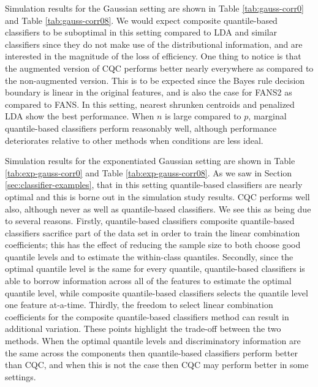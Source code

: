 Simulation results for the Gaussian setting are shown in Table
\ref{tab:gauss-corr0} and Table \ref{tab:gauss-corr08}.  We would expect
composite quantile-based classifiers to be suboptimal in this setting compared
to LDA and similar classifiers since they do not make use of the distributional
information, and are interested in the magnitude of the loss of efficiency.  One
thing to notice is that the augmented version of CQC performs better nearly
everywhere as compared to the non-augmented version.  This is to be expected
since the Bayes rule decision boundary is linear in the original features, and
is also the case for FANS2 as compared to FANS.  In this setting, nearest
shrunken centroids and penalized LDA show the best performance.  When $n$ is
large compared to $p$, marginal quantile-based classifiers perform reasonably
well, although performance deteriorates relative to other methods when
conditions are less ideal.

Simulation results for the exponentiated Gaussian setting are shown in Table
\ref{tab:exp-gauss-corr0} and Table \ref{tab:exp-gauss-corr08}.  As we saw in
Section \ref{sec:classifier-examples}, that in this setting quantile-based
classifiers are nearly optimal and this is borne out in the simulation study
results.  CQC performs well also, although never as well as quantile-based
classifiers.  We see this as being due to several reasons.  Firstly,
quantile-based classifiers composite quantile-based classifiers sacrifice part
of the data set in order to train the linear combination coefficients; this has
the effect of reducing the sample size to both choose good quantile levels and
to estimate the within-class quantiles.  Secondly, since the optimal quantile
level is the same for every quantile, quantile-based classifiers is able to
borrow information across all of the features to estimate the optimal quantile
level, while composite quantile-based classifiers selects the quantile level one
feature at-a-time.  Thirdly, the freedom to select linear combination
coefficients for the composite quantile-based classifiers method can result in
additional variation.  These points highlight the trade-off between the two
methods.  When the optimal quantile levels and discriminatory information are
the same across the components then quantile-based classifiers perform better
than CQC, and when this is not the case then CQC may perform better in some
settings.

